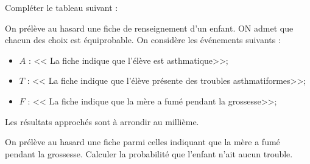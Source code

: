 \begin{questions}
	\question[2] Compléter le tableau suivant :
	
	\begin{center}
		
	\end{center}

	\question On prélève au hasard une fiche de renseignement d'un enfant. ON admet que chacun des choix est équiprobable. On considère les événements suivants :
	
	\begin{itemize}
		\item $A$ : << La fiche indique que l'élève est asthmatique>>; 
		\item $T$ : << La fiche indique que l'élève présente des troubles asthmatiformes>>;
		\item $F$ : << La fiche indique que la mère a fumé pendant la grossesse>>;
	\end{itemize}

	Les résultats approchés sont à arrondir au millième.
	

	\question[1] On prélève au hasard une fiche parmi celles indiquant que la mère a fumé pendant la grossesse. Calculer la probabilité que l'enfant n'ait aucun trouble. 
\end{questions}